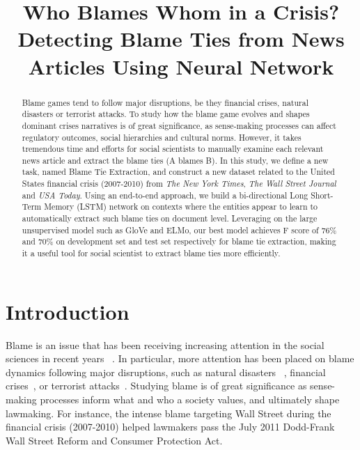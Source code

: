 \documentclass[11pt,a4paper]{article}
\title{Who Blames Whom in a Crisis? Detecting Blame Ties from News Articles Using Neural Network}
\author{
}
\date{}
\begin{document}
\maketitle
\begin{abstract}
Blame games tend to follow major disruptions, be they financial crises, natural disasters or terrorist attacks. To study how the blame game evolves and shapes dominant crises narratives is of great significance, as sense-making processes can affect regulatory outcomes, social hierarchies and cultural norms. However, it takes tremendous time and efforts for social scientists to manually examine each relevant news article and extract the blame ties (A blames B). In this study, we define a new task, named Blame Tie Extraction, and construct a new dataset related to the United States financial crisis (2007-2010) from {\it The New York Times}, {\it The Wall Street Journal} and {\it USA Today}. Using an end-to-end approach, we build a bi-directional Long Short-Term Memory (LSTM) network on contexts where the entities appear to learn to automatically extract such blame ties on document level. Leveraging on the large unsupervised model such as GloVe and ELMo, our best model achieves F score of 76\% and 70\% on development set and test set respectively for blame tie extraction, making it a useful tool for social scientist to extract blame ties more efficiently.
\end{abstract}

\section{Introduction}

Blame is an issue that has been receiving increasing attention in the social sciences in recent years ~\cite{alicke2000culpable,mary1992risk,farmer2006aids,gephart1993textual,hobolt2014blaming,hood2010blame,shaver2012attribution,tilly2009credit}. In particular, more attention has been placed on blame dynamics following major disruptions, such as natural disasters ~\cite{boin2010leadership,malhotra2008attributing}, financial crises~\cite{nicolno,tourish2012metaphors}, or terrorist attacks~\cite{olmeda2008reversal}. Studying blame is of great significance as sense-making processes inform what and who a society values, and ultimately shape lawmaking. For instance, the intense blame targeting Wall Street during the financial crisis (2007-2010) helped lawmakers pass the July 2011 Dodd-Frank Wall Street Reform and Consumer Protection Act.
\end{document}
